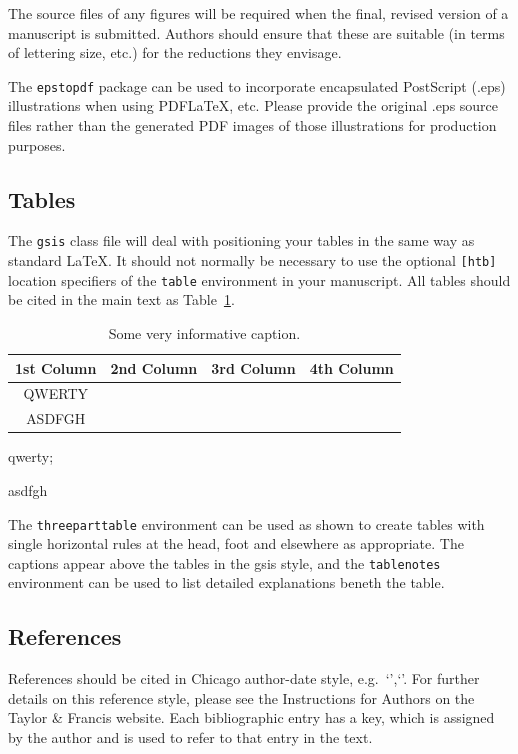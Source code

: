 \documentclass[12pt]{gsis}  %
\begin{document}
The source files of any figures will be required when the final, revised version of a manuscript is submitted. Authors should ensure that these are suitable (in terms of lettering size, etc.) for the reductions they envisage.

The \texttt{epstopdf} package can be used to incorporate encapsulated PostScript (.eps) illustrations when using PDF\LaTeX, etc. Please provide the original .eps source files rather than the generated PDF images of those illustrations for production purposes.

\subsection{Tables}
The \texttt{gsis} class file will deal with positioning your tables in the same way as standard \LaTeX. It should not normally be necessary to use the optional \texttt{[htb]} location specifiers of the \texttt{table} environment in your manuscript. All tables should be cited in the main text as Table~\ref{tab1}.

\begin{table}[htb]
    \caption{Some very informative caption.}
    \begin{threeparttable}
    \begin{tabular}{c c c c}
        \toprule
        \textbf{1st Column} & \textbf{2nd Column} & \textbf{3rd Column} & \textbf{4th Column} \\ \midrule
          QWERTY\tnote{1}   &                     &                     &  \\
          ASDFGH\tnote{2}   &                     &                     &  \\ \bottomrule
    \end{tabular}
    \begin{tablenotes}
    \item[1] qwerty; \item[2] asdfgh
    \end{tablenotes}
    \end{threeparttable}
    \label{tab1}
\end{table}

The \texttt{threeparttable} environment can be used as shown to create tables with single horizontal rules at the head, foot and elsewhere as appropriate. The captions appear above the tables in the \textsf{gsis} style, and the \texttt{tablenotes} environment can be used to list detailed explanations beneth the table. 


\subsection{References}
References should be cited in Chicago author-date style, e.g.\ `\citep{cao2009super}',`\citep{gao2013convergence}'. For further details on this reference style, please see the Instructions for Authors on the Taylor \& Francis website. Each bibliographic entry has a key, which is assigned by the author and is used to refer to that entry in the text. 
\end{document}
